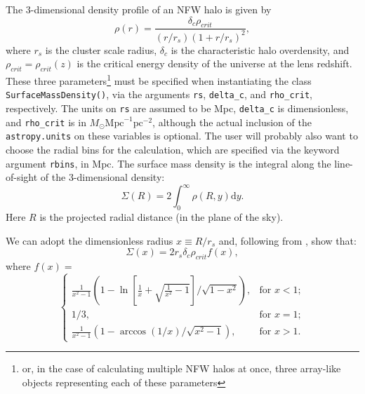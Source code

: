 \documentclass[twocolumn]{aastex6}
\newcommand{\code}{\lstinline[style=codeintext]}
\begin{document}
The 3-dimensional density profile of an NFW halo is given by
\begin{equation}\label{nfw3d}
\rho(r) = \frac{\delta_c \rho_{crit}}{(r/r_s)(1+r/r_s)^2},
\end{equation}
where $r_s$ is the cluster scale radius, $\delta_c$ is the characteristic halo overdensity, and $\rho_{crit} = \rho_{crit}(z)$ is the critical energy density of the universe at the lens redshift. These three parameters\footnote{or, in the case of calculating multiple NFW halos at once, three array-like objects representing each of these parameters} must be specified when instantiating the class \code{SurfaceMassDensity()}, via the arguments \code{rs}, \code{delta_c}, and \code{rho_crit}, respectively. The units on \code{rs} are assumed to be Mpc, \code{delta_c} is dimensionless, and \code{rho_crit} is in $M_{\odot}\mathrm{Mpc}^{-1}\mathrm{pc}^{-2}$, although the actual inclusion of the \code{astropy.units} on these variables is optional. The user will probably also want to choose the radial bins for the calculation, which are specified via the keyword argument \code{rbins}, in Mpc. The surface mass density is the integral along the line-of-sight of the 3-dimensional density:
\begin{equation}
\Sigma(R) = 2 \int_0^{\infty} \rho(R,y) \mathrm{d}y.
\end{equation}
Here $R$ is the projected radial distance (in the plane of the sky).

We can adopt the dimensionless radius $x \equiv R/r_s$ and, following from \citet{Wright00}, show that:
\begin{equation}\label{sigma}
\Sigma(x) = 2 r_s \delta_c \rho_{crit} f(x),
\end{equation}
where $f(x) = $
\begin{equation}
    \begin{cases}
        \frac{1}{x^2 - 1} \left( 1 - \ln{ \left[ \frac{1}{x} + \sqrt{ \frac{1}{x^2} - 1} \right]} / \sqrt{1 - x^2} \right), & \text{for } x < 1; \\
        1/3, & \text{for } x = 1; \\
        \frac{1}{x^2 - 1} \left( 1 - \arccos{(1/x)} / \sqrt{x^2 - 1} \right), & \text{for } x > 1.
    \end{cases}
\end{equation}
\end{document}
